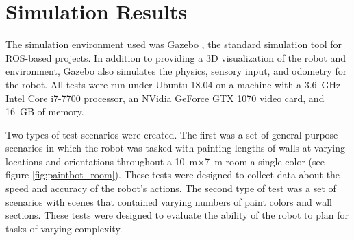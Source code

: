 \section{Simulation Results} \label{sec:results}
The simulation environment used was Gazebo \cite{gazebo}, the standard simulation tool for ROS-based projects. In addition to providing a 3D visualization of the robot and environment, Gazebo also simulates the physics, sensory input, and odometry for the robot. All tests were run under Ubuntu 18.04 on a machine with a \SI{3.6}{GHz} Intel Core i7-7700 processor, an NVidia GeForce GTX 1070 video card, and \SI{16}{GB} of memory.

Two types of test scenarios were created. The first was a set of general purpose scenarios in which the robot was tasked with painting lengths of walls at varying locations and orientations throughout a \SI{10}{\meter}$\times$\SI{7}{\meter} room a single color (see figure \ref{fig:paintbot_room}). These tests were designed to collect data about the speed and accuracy of the robot's actions. The second type of test was a set of scenarios with scenes that contained varying numbers of paint colors and wall sections. These tests were designed to evaluate the ability of the robot to plan for tasks of varying complexity.
